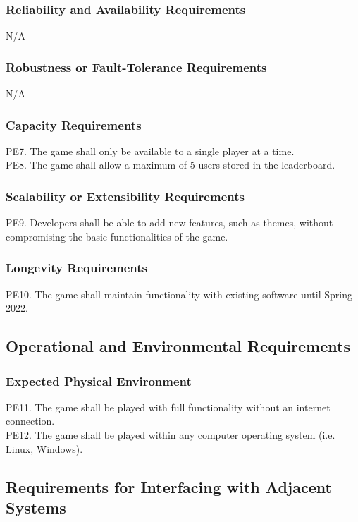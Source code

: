 \documentclass[12pt]{article}
\begin{document}
    \subsubsection{Reliability and Availability Requirements}
    N/A

    \subsubsection{Robustness or Fault-Tolerance Requirements}
    N/A
    
    \subsubsection{Capacity Requirements}
    PE7. The game shall only be available to a single player at a time.\\
    PE8. The game shall allow a maximum of 5 users stored in the leaderboard.
    
    \subsubsection{Scalability or Extensibility Requirements}
    PE9. Developers shall be able to add new features, such as themes, without compromising the basic functionalities of the game. 
    
    \subsubsection{Longevity Requirements}
    PE10. The game shall maintain functionality with existing software until Spring 2022.

\subsection{Operational and Environmental Requirements}
    \subsubsection{Expected Physical Environment}
    PE11. The game shall be played with full functionality without an internet connection.\\
    PE12. The game shall be played within any computer operating system (i.e. Linux, Windows).
    
\subsection{Requirements for Interfacing with Adjacent Systems}
\end{document}
